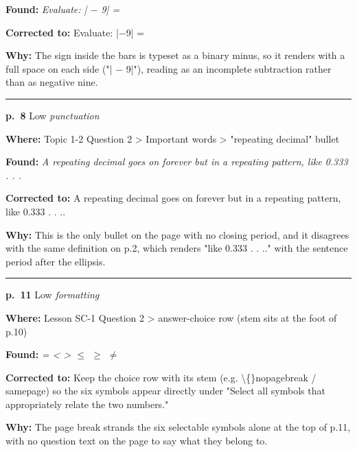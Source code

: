 \documentclass[11pt]{article}
\newcommand{\sevlow}[1]{\textcolor{black!55}{#1}}
\begin{document}
\noindent\textbf{Found: }\textit{Evaluate: | $-$ 9| =}\par
\noindent\textbf{Corrected to: }Evaluate: |$-$9| =\par
\noindent\textbf{Why: }The sign inside the bars is typeset as a binary minus, so it renders with a full space on each side ("| $-$ 9|"), reading as an incomplete subtraction rather than as negative nine.\par\vspace{4pt}
\noindent\rule{\textwidth}{0.4pt}\par\nobreak\vspace{2pt}
\noindent\textbf{p.~8} \quad \sevlow{Low} \quad \textit{punctuation}\par
\noindent\textbf{Where: }Topic 1-2 Question 2 > Important words > "repeating decimal" bullet\par
\noindent\textbf{Found: }\textit{A repeating decimal goes on forever but in a repeating pattern, like 0.333 . . .}\par
\noindent\textbf{Corrected to: }A repeating decimal goes on forever but in a repeating pattern, like 0.333 . . ..\par
\noindent\textbf{Why: }This is the only bullet on the page with no closing period, and it disagrees with the same definition on p.2, which renders "like 0.333 . . .." with the sentence period after the ellipsis.\par\vspace{4pt}
\noindent\rule{\textwidth}{0.4pt}\par\nobreak\vspace{2pt}
\noindent\textbf{p.~11} \quad \sevlow{Low} \quad \textit{formatting}\par
\noindent\textbf{Where: }Lesson SC-1 Question 2 > answer-choice row (stem sits at the foot of p.10)\par
\noindent\textbf{Found: }\textit{= < > $\le$ $\ge$ $\neq$}\par
\noindent\textbf{Corrected to: }Keep the choice row with its stem (e.g. \textbackslash\{\}nopagebreak / samepage) so the six symbols appear directly under "Select all symbols that appropriately relate the two numbers."\par
\noindent\textbf{Why: }The page break strands the six selectable symbols alone at the top of p.11, with no question text on the page to say what they belong to.\par\vspace{4pt}
\end{document}
